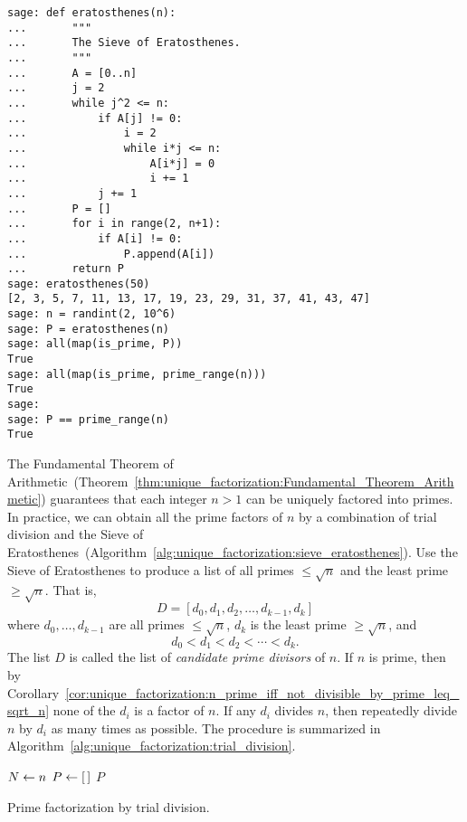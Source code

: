 \begin{lstlisting}
sage: def eratosthenes(n):
...       """
...       The Sieve of Eratosthenes.
...       """
...       A = [0..n]
...       j = 2
...       while j^2 <= n:
...           if A[j] != 0:
...               i = 2
...               while i*j <= n:
...                   A[i*j] = 0
...                   i += 1
...           j += 1
...       P = []
...       for i in range(2, n+1):
...           if A[i] != 0:
...               P.append(A[i])
...       return P
sage: eratosthenes(50)
[2, 3, 5, 7, 11, 13, 17, 19, 23, 29, 31, 37, 41, 43, 47]
sage: n = randint(2, 10^6)
sage: P = eratosthenes(n)
sage: all(map(is_prime, P))
True
sage: all(map(is_prime, prime_range(n)))
True
sage:
sage: P == prime_range(n)
True
\end{lstlisting}

The Fundamental Theorem of
Arithmetic~(Theorem~\ref{thm:unique_factorization:Fundamental_Theorem_Arithmetic})
guarantees that each integer $n > 1$ can be uniquely factored into
primes. In practice, we can obtain all the prime factors of $n$ by a
combination of trial division and the Sieve of
Eratosthenes~(Algorithm~\ref{alg:unique_factorization:sieve_eratosthenes}). Use
the Sieve of Eratosthenes to produce a list of all primes
$\leq \sqrt{n}$ and the least prime $\geq \sqrt{n}$. That is,
\[
D
=
[d_0, d_1, d_2, \dots, d_{k-1}, d_k]
\]
where $d_0, \dots, d_{k-1}$ are all primes $\leq \sqrt{n}$, $d_k$ is
the least prime $\geq \sqrt{n}$, and
\[
d_0 < d_1 < d_2 < \cdots < d_k.
\]
The list $D$ is called the list of \emph{candidate prime divisors}
 of $n$. If $n$ is prime, then by
Corollary~\ref{cor:unique_factorization:n_prime_iff_not_divisible_by_prime_leq_sqrt_n}
none of the $d_i$ is a factor of $n$. If any $d_i$ divides $n$, then
repeatedly divide $n$ by $d_i$ as many times as possible. The
procedure is summarized in
Algorithm~\ref{alg:unique_factorization:trial_division}.
{\color{red}{This algorithm is wrong; rework it!}}

\begin{algorithm}[!htpb]
\dontprintsemicolon
\BlankLine
$N \leftarrow n$\;
$P \leftarrow [\,]$ \;
\Return $P$
\caption{Prime factorization by trial division.}
\label{alg:unique_factorization:trial_division}
\end{algorithm}

